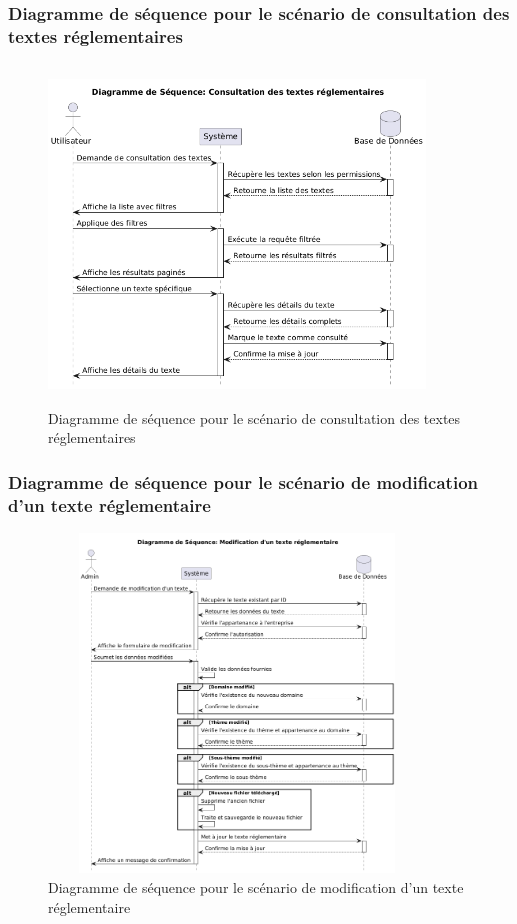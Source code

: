 \subsubsection{Diagramme de séquence pour le scénario de consultation des textes réglementaires}
\begin{figure}[H]
    \centering
    \includegraphics[width=10cm,height=9cm]{images/consulttextseq.png}
    \caption{Diagramme de séquence pour le scénario de consultation des textes réglementaires}
\end{figure}

\subsubsection{Diagramme de séquence pour le scénario de modification d'un texte réglementaire}
\begin{figure}[H]
    \centering
    \includegraphics[width=10cm,height=9cm]{images/modifytextseq.png}
    \caption{Diagramme de séquence pour le scénario de modification d'un texte réglementaire}
\end{figure}

